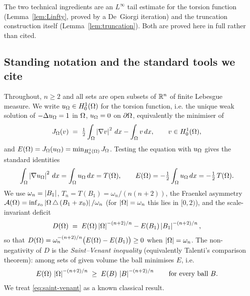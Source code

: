The two technical ingredients are an $L^\infty$ tail estimate for the
torsion function (Lemma~\ref{lem:Linfty}, proved by a De~Giorgi
iteration) and the truncation construction itself
(Lemma~\ref{lem:truncation}). Both are proved here in full rather than
cited.

\subsection{Standing notation and the standard tools we cite}
\label{ssec:notation}

Throughout, $n\ge2$ and all sets are open subsets of $\mathbb R^n$ of finite
Lebesgue measure. We write $u_\Omega\in H^1_0(\Omega)$ for the torsion
function, i.e. the unique weak solution of $-\Delta u_\Omega=1$ in $\Omega$,
$u_\Omega=0$ on $\partial\Omega$, equivalently the minimiser of
\begin{equation}\label{eq:energy-def}
   J_\Omega(v)\;=\;\tfrac12\int_\Omega\left|\nabla v\right|^2\,dx-\int_\Omega v\,dx,
   \qquad v\in H^1_0(\Omega),
\end{equation}
and $E(\Omega)=J_\Omega(u_\Omega)=\min_{H^1_0(\Omega)}J_\Omega$. Testing the equation
with $u_\Omega$ gives the standard identities
\begin{equation}\label{eq:energy-identities}
   \int_\Omega\left|\nabla u_\Omega\right|^2\,dx=\int_\Omega u_\Omega\,dx=T(\Omega),
   \qquad
   E(\Omega)=-\tfrac12\int_\Omega u_\Omega\,dx=-\tfrac12\,T(\Omega).
\end{equation}
We use $\omega_n=\left|B_1\right|$, $T_n=T(B_1)=\omega_n/(n(n+2))$, the Fraenkel
asymmetry $\mathcal A(\Omega)=\inf_{x_0}\left|\Omega\,\triangle\,(B_1+x_0)\right|/\omega_n$
(for $\left|\Omega\right|=\omega_n$ this lies in $[0,2)$), and the scale-invariant
deficit
\begin{equation}\label{eq:deficit-def}
   D(\Omega)\;=\;E(\Omega)\left|\Omega\right|^{-(n+2)/n}-E(B_1)\left|B_1\right|^{-(n+2)/n},
\end{equation}
so that $D(\Omega)=\omega_n^{-(n+2)/n}\bigl(E(\Omega)-E(B_1)\bigr)\ge0$ when
$\left|\Omega\right|=\omega_n$. The non-negativity of $D$ is the
\emph{Saint--Venant inequality} (equivalently Talenti's comparison
theorem): among sets of given volume the ball minimises $E$, i.e.
\begin{equation}\label{eq:saint-venant}
   E(\Omega)\,\left|\Omega\right|^{-(n+2)/n}\;\ge\;E(B)\,\left|B\right|^{-(n+2)/n}
   \qquad\text{for every ball }B.
\end{equation}
We treat \eqref{eq:saint-venant} as a known classical result.

